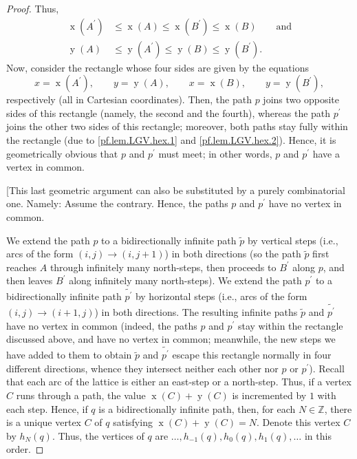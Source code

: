 \documentclass[reqno]{amsart}
\newcommand{\0}{\phantom{c}}
\newenvironment{verlong}{}{}
\theoremstyle{plain}
\theoremstyle{definition}
\numberwithin{equation}{section}
\begin{document}
\begin{verlong}
\begin{proof}
Thus,%
\begin{align}
\operatorname*{x}\left(  A^{\prime}\right)   &  \leq\operatorname*{x}\left(
A\right)  \leq\operatorname*{x}\left(  B^{\prime}\right)  \leq
\operatorname*{x}\left(  B\right)  \qquad\text{and}\label{pf.lem.LGV.hex.1}\\
\operatorname*{y}\left(  A\right)   &  \leq\operatorname*{y}\left(  A^{\prime
}\right)  \leq\operatorname*{y}\left(  B\right)  \leq\operatorname*{y}\left(
B^{\prime}\right)  . \label{pf.lem.LGV.hex.2}%
\end{align}
Now, consider the rectangle whose four sides are given by the equations%
\[
x=\operatorname*{x}\left(  A^{\prime}\right)  ,\qquad y=\operatorname*{y}%
\left(  A\right)  ,\qquad x=\operatorname*{x}\left(  B\right)  ,\qquad
y=\operatorname*{y}\left(  B^{\prime}\right)  ,
\]
respectively (all in Cartesian coordinates). Then, the path $p$ joins two
opposite sides of this rectangle (namely, the second and the fourth), whereas
the path $p^{\prime}$ joins the other two sides of this rectangle; moreover,
both paths stay fully within the rectangle (due to \eqref{pf.lem.LGV.hex.1}
and \eqref{pf.lem.LGV.hex.2}). Hence, it is geometrically obvious that $p$ and
$p^{\prime}$ must meet; in other words, $p$ and $p^{\prime}$ have a vertex in common.

[This last geometric argument can also be substituted by a purely
combinatorial one. Namely: Assume the contrary. Hence, the paths $p$ and
$p^{\prime}$ have no vertex in common.

We extend the path $p$ to a bidirectionally infinite path $\widetilde{p}$ by
vertical steps (i.e., arcs of the form $\left(  i,j\right)  \rightarrow\left(
i,j+1\right)  $) in both directions (so the path $\widetilde{p}$ first reaches
$A$ through infinitely many north-steps, then proceeds to $B^{\prime}$ along
$p$, and then leaves $B^{\prime}$ along infinitely many north-steps). We
extend the path $p^{\prime}$ to a bidirectionally infinite path
$\widetilde{p^{\prime}}$ by horizontal steps (i.e., arcs of the form $\left(
i,j\right)  \rightarrow\left(  i+1,j\right)  $) in both directions. The
resulting infinite paths $\widetilde{p}$ and $\widetilde{p^{\prime}}$ have no
vertex in common (indeed, the paths $p$ and $p^{\prime}$ stay within the
rectangle discussed above, and have no vertex in common; meanwhile, the new
steps we have added to them to obtain $\widetilde{p}$ and
$\widetilde{p^{\prime}}$ escape this rectangle normally in four different
directions, whence they intersect neither each other nor $p$ or $p^{\prime}$).
Recall that each arc of the lattice is either an east-step or a north-step.
Thus, if a vertex $C$ runs through a path, the value $\operatorname*{x}\left(
C\right)  +\operatorname*{y}\left(  C\right)  $ is incremented by $1$ with
each step. Hence, if $q$ is a bidirectionally infinite path, then, for each
$N\in\mathbb{Z}$, there is a unique vertex $C$ of $q$ satisfying
$\operatorname*{x}\left(  C\right)  +\operatorname*{y}\left(  C\right)  =N$.
Denote this vertex $C$ by $h_{N}\left(  q\right)  $. Thus, the vertices of $q$
are $\ldots,h_{-1}\left(  q\right)  ,h_{0}\left(  q\right)  ,h_{1}\left(
q\right)  ,\ldots$ in this order.


\end{proof}
\end{verlong}
\end{document}
